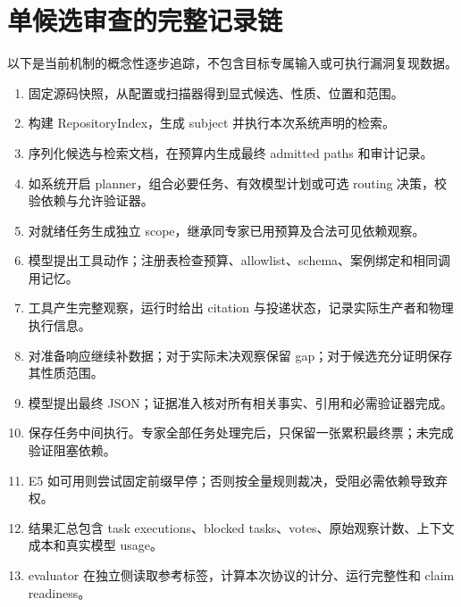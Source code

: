 \documentclass[UTF8,a4paper,zihao=-4,fontset=none]{ctexart}
\begin{document}
\section{单候选审查的完整记录链}
以下是当前机制的概念性逐步追踪，不包含目标专属输入或可执行漏洞复现数据。
\begin{enumerate}
\item 固定源码快照，从配置或扫描器得到显式候选、性质、位置和范围。
\item 构建 RepositoryIndex，生成 subject 并执行本次系统声明的检索。
\item 序列化候选与检索文档，在预算内生成最终 admitted paths 和审计记录。
\item 如系统开启 planner，组合必要任务、有效模型计划或可选 routing 决策，校验依赖与允许验证器。
\item 对就绪任务生成独立 scope，继承同专家已用预算及合法可见依赖观察。
\item 模型提出工具动作；注册表检查预算、allowlist、schema、案例绑定和相同调用记忆。
\item 工具产生完整观察，运行时给出 citation 与投递状态，记录实际生产者和物理执行信息。
\item 对准备响应继续补数据；对于实际未决观察保留 gap；对于候选充分证明保存其性质范围。
\item 模型提出最终 JSON；证据准入核对所有相关事实、引用和必需验证器完成。
\item 保存任务中间执行。专家全部任务处理完后，只保留一张累积最终票；未完成验证阻塞依赖。
\item E5 如可用则尝试固定前缀早停；否则按全量规则裁决，受阻必需依赖导致弃权。
\item 结果汇总包含 task executions、blocked tasks、votes、原始观察计数、上下文成本和真实模型 usage。
\item evaluator 在独立侧读取参考标签，计算本次协议的计分、运行完整性和 claim readiness。
\end{enumerate}
\end{document}
